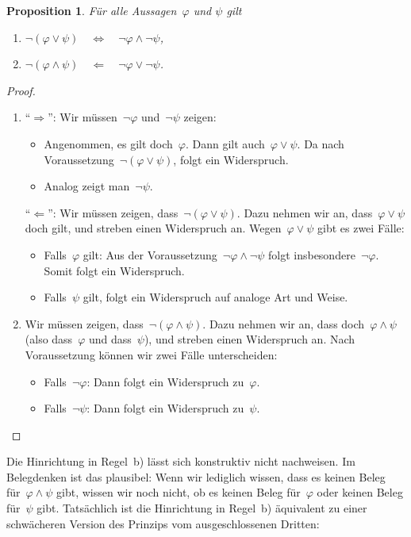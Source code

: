 \documentclass[a4paper,ngerman,12pt]{scrartcl}
\theoremstyle{definition}
\theoremstyle{plain}
\newtheorem{prop}[defn]{Proposition}
\theoremstyle{remark}
\renewcommand{\_}{\mathpunct{.}\,}
\newcommand{\?}{\,{:}\,}
\begin{document}
\begin{prop}Für alle Aussagen~$\varphi$ und $\psi$ gilt
\begin{enumerate}
\item $\neg(\varphi \vee \psi) \quad\Longleftrightarrow\quad \neg\varphi \wedge
\neg\psi$,
\item $\neg(\varphi \wedge \psi) \quad\Longleftarrow\quad \neg\varphi \vee
\neg\psi$.
\end{enumerate}
\end{prop}
\begin{proof}\begin{enumerate}
\item "`$\Rightarrow$"': Wir müssen~$\neg\varphi$ und~$\neg\psi$ zeigen:
\begin{itemize}
\item Angenommen, es gilt doch~$\varphi$. Dann gilt auch~$\varphi \vee \psi$. Da
nach Voraussetzung~$\neg(\varphi \vee \psi)$, folgt ein Widerspruch.
\item Analog zeigt man~$\neg\psi$.
\end{itemize}

"`$\Leftarrow$"': Wir müssen zeigen, dass~$\neg(\varphi \vee \psi)$. Dazu
nehmen wir an, dass~$\varphi \vee \psi$ doch gilt, und streben einen Widerspruch an.
Wegen~$\varphi \vee \psi$ gibt es zwei Fälle:
\begin{itemize}
\item Falls~$\varphi$ gilt: Aus der Voraussetzung~$\neg\varphi \wedge \neg\psi$
folgt insbesondere~$\neg\varphi$. Somit folgt ein Widerspruch.
\item Falls~$\psi$ gilt, folgt ein Widerspruch auf analoge Art und
Weise.
\end{itemize}

\item
Wir müssen zeigen, dass~$\neg(\varphi \wedge \psi)$. Dazu nehmen wir an, dass
doch~$\varphi \wedge \psi$ (also dass~$\varphi$ und dass~$\psi$), und streben
einen Widerspruch an. Nach Voraussetzung können wir zwei Fälle unterscheiden:
\begin{itemize}
\item Falls~$\neg\varphi$: Dann folgt ein Widerspruch zu~$\varphi$.
\item Falls~$\neg\psi$: Dann folgt ein Widerspruch zu~$\psi$.\qedhere
\end{itemize}
\end{enumerate}
\end{proof}

Die Hinrichtung in Regel~b) lässt sich konstruktiv nicht nachweisen. Im
Belegdenken ist das plausibel: Wenn wir lediglich wissen, dass es keinen Beleg
für~$\varphi \wedge \psi$ gibt, wissen wir noch nicht, ob es keinen Beleg
für~$\varphi$ oder keinen Beleg für~$\psi$ gibt. Tatsächlich ist die
Hinrichtung in Regel~b) äquivalent zu einer schwächeren Version des Prinzips
vom ausgeschlossenen Dritten:
\end{document}
